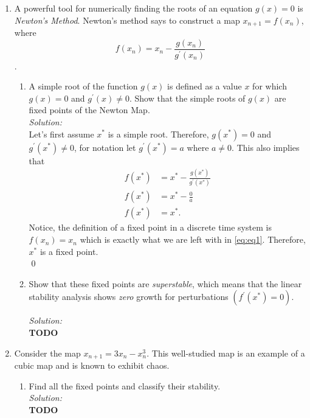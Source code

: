 \documentclass[10pt]{amsart}
\theoremstyle{nonumberplain}
\begin{document}
\begin{enumerate}[label={\bf {\arabic*}:}]
\item A powerful tool for numerically finding the roots of an equation $g(x) = 0$ is \textit{Newton's Method}.
Newton's method says to construct a map $x_{n + 1} = f(x_n)$, where 
$$
f(x_n) = x_n - \frac{g(x_n)}{g^\prime(x_n)}
$$. 
\begin{enumerate}

\item A simple root of the function $g(x)$ is defined as a value $x$ for which $g(x) = 0$ and $g^\prime(x) \neq 0$.
Show that the simple roots of $g(x)$ are fixed points of the Newton Map. \\

\textit{Solution:} \\
Let's first assume $x^*$ is a simple root.
Therefore, $g(x^*) = 0$ and $g^\prime(x^*) \neq 0$, for notation let $g^\prime(x^*) = a$ where $a \neq 0$.
This also implies that 
\begin{align}
f(x^*) &= x^* - \frac{g(x^*)}{g^\prime(x^*)} \nonumber \\
f(x^*) &= x^* - \frac 0 a \nonumber \\
f(x^*) &= x^*.
\label{eq:eq1}
\end{align}
Notice, the definition of a fixed point in a discrete time system is $f(x_n) = x_n$ which is exactly what we are left with in \eqref{eq:eq1}.
Therefore, $x^*$ is a fixed point. \\
\qed \\

\item Show that these fixed points are \textit{superstable}, which means that the linear stability analysis shows \textit{zero} growth for perturbations $(f^\prime(x^*) = 0).$

\textit{Solution:} \\
\textbf{TODO} \\

\end{enumerate}

\item Consider the map $x_{n + 1} = 3x_n - x_n^3$.
This well-studied map is an example of a cubic map and is known to exhibit chaos.
\begin{enumerate}

\item Find all the fixed points and classify their stability. \\

\textit{Solution:} \\
\textbf{TODO} \\


\end{enumerate}
\end{enumerate}
\end{document}
